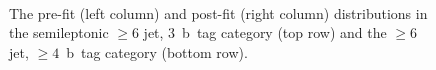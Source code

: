 \begin{figure}
\begin{centering}
 \\
\caption[The pre-fit and post-fit distributions in the semileptonic $\geq6$-jet categories]{The pre-fit (left column) and post-fit (right column) distributions in the semileptonic $\geq6$ jet, 3~b~tag category (top row) and the $\geq6$ jet, $\geq4$~b~tag category (bottom row).}
\label{fig:tth_postfit3}
\end{centering}
\end{figure}

